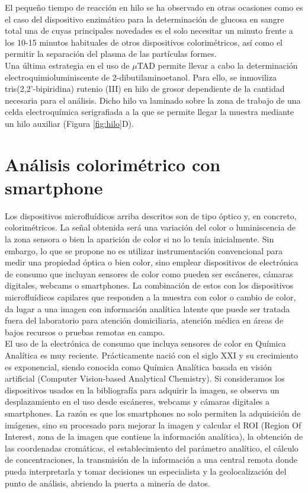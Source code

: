 \documentclass{article}
\begin{document}
El pequeño tiempo de reacción en hilo se ha observado en otras ocasiones como es el caso del dispositivo enzimático para la determinación de glucosa en sangre total una de cuyas principales novedades es el solo necesitar un minuto frente a los 10-15 minutos habituales de otros dispositivos colorimétricos, así como el permitir la separación del plasma de las partículas formes.\\

Una última estrategia en el uso de $\mu$TAD permite llevar a cabo la determinación electroquimioluminiscente de 2-dibutilaminoetanol. Para ello, se inmoviliza tris(2,2'-bipiridina) rutenio (III) en hilo de grosor dependiente de la cantidad necesaria para el análisis. Dicho hilo va laminado sobre la zona de trabajo de una celda electroquímica serigrafiada a la que se permite llegar la muestra mediante un hilo auxiliar (Figura \ref{fig:hilo}D).\\

\section{Análisis colorimétrico con smartphone}

Los dispositivos microfluídicos arriba descritos son de tipo óptico y, en concreto, colorimétricos. La señal obtenida será una variación del color o luminiscencia de la zona sensora o bien la aparición de color si no lo tenía inicialmente. Sin embargo, lo que se propone no es utilizar instrumentación convencional para medir una propiedad óptica o bien color, sino emplear dispositivos de electrónica de consumo que incluyan sensores de color como pueden ser escáneres, cámaras digitales, webcams o smartphones. La combinación de estos con los dispositivos microfluídicos capilares que responden a la muestra con color o cambio de color, da lugar a una imagen con información analítica latente que puede ser tratada fuera del laboratorio para atención domiciliaria, atención médica en áreas de bajos recursos o pruebas remotas en campo.\\

El uso de la electrónica de consumo que incluya sensores de color en Química Analítica es muy reciente. Prácticamente nació con el siglo XXI y su crecimiento es exponencial, siendo conocida como Química Analítica basada en visión artificial (Computer Vision-based Analytical Chemistry)\cite{Capitan-Vallvey2015}. Si consideramos los dispositivos usados en la bibliografía para adquirir la imagen, se observa un desplazamiento en el uso desde escáneres, webcams y cámaras digitales a smartphones. La razón es que los smartphones no solo permiten la adquisición de imágenes, sino su procesado para mejorar la imagen y calcular el ROI (Region Of Interest, zona de la imagen que contiene la información analítica), la obtención de las coordenadas cromáticas, el establecimiento del parámetro analítico, el cálculo de concentraciones, la transmisión de la información a una central remota donde pueda interpretarla y tomar decisiones un especialista y la geolocalización del punto de análisis, abriendo la puerta a minería de datos.\\
\end{document}
